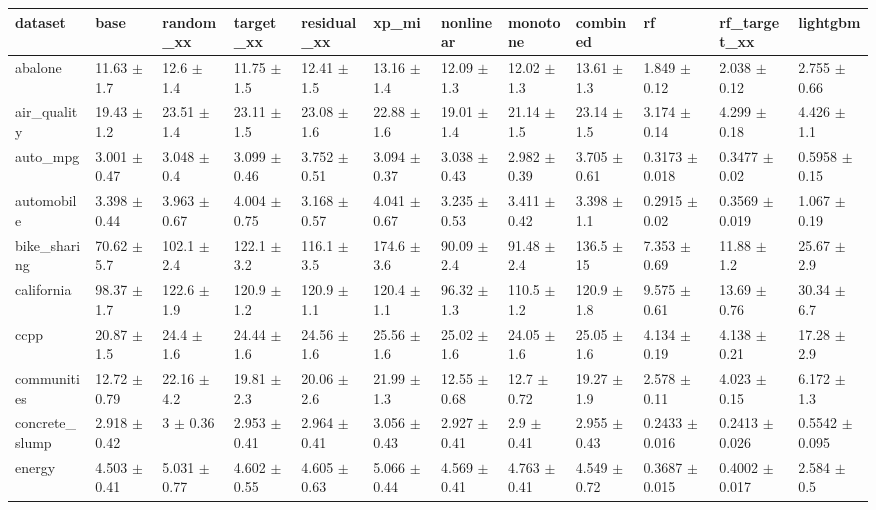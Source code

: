 \begin{tabular}{llllllllllll}
\toprule
dataset & base & random\_xx & target\_xx & residual\_xx & xp\_mi & nonlinear & monotone & combined & rf & rf\_target\_xx & lightgbm \\
\midrule
abalone & 11.63 $\pm$ 1.7 & 12.6 $\pm$ 1.4 & 11.75 $\pm$ 1.5 & 12.41 $\pm$ 1.5 & 13.16 $\pm$ 1.4 & 12.09 $\pm$ 1.3 & 12.02 $\pm$ 1.3 & 13.61 $\pm$ 1.3 & 1.849 $\pm$ 0.12 & 2.038 $\pm$ 0.12 & 2.755 $\pm$ 0.66 \\
air\_quality & 19.43 $\pm$ 1.2 & 23.51 $\pm$ 1.4 & 23.11 $\pm$ 1.5 & 23.08 $\pm$ 1.6 & 22.88 $\pm$ 1.6 & 19.01 $\pm$ 1.4 & 21.14 $\pm$ 1.5 & 23.14 $\pm$ 1.5 & 3.174 $\pm$ 0.14 & 4.299 $\pm$ 0.18 & 4.426 $\pm$ 1.1 \\
auto\_mpg & 3.001 $\pm$ 0.47 & 3.048 $\pm$ 0.4 & 3.099 $\pm$ 0.46 & 3.752 $\pm$ 0.51 & 3.094 $\pm$ 0.37 & 3.038 $\pm$ 0.43 & 2.982 $\pm$ 0.39 & 3.705 $\pm$ 0.61 & 0.3173 $\pm$ 0.018 & 0.3477 $\pm$ 0.02 & 0.5958 $\pm$ 0.15 \\
automobile & 3.398 $\pm$ 0.44 & 3.963 $\pm$ 0.67 & 4.004 $\pm$ 0.75 & 3.168 $\pm$ 0.57 & 4.041 $\pm$ 0.67 & 3.235 $\pm$ 0.53 & 3.411 $\pm$ 0.42 & 3.398 $\pm$ 1.1 & 0.2915 $\pm$ 0.02 & 0.3569 $\pm$ 0.019 & 1.067 $\pm$ 0.19 \\
bike\_sharing & 70.62 $\pm$ 5.7 & 102.1 $\pm$ 2.4 & 122.1 $\pm$ 3.2 & 116.1 $\pm$ 3.5 & 174.6 $\pm$ 3.6 & 90.09 $\pm$ 2.4 & 91.48 $\pm$ 2.4 & 136.5 $\pm$ 15 & 7.353 $\pm$ 0.69 & 11.88 $\pm$ 1.2 & 25.67 $\pm$ 2.9 \\
california & 98.37 $\pm$ 1.7 & 122.6 $\pm$ 1.9 & 120.9 $\pm$ 1.2 & 120.9 $\pm$ 1.1 & 120.4 $\pm$ 1.1 & 96.32 $\pm$ 1.3 & 110.5 $\pm$ 1.2 & 120.9 $\pm$ 1.8 & 9.575 $\pm$ 0.61 & 13.69 $\pm$ 0.76 & 30.34 $\pm$ 6.7 \\
ccpp & 20.87 $\pm$ 1.5 & 24.4 $\pm$ 1.6 & 24.44 $\pm$ 1.6 & 24.56 $\pm$ 1.6 & 25.56 $\pm$ 1.6 & 25.02 $\pm$ 1.6 & 24.05 $\pm$ 1.6 & 25.05 $\pm$ 1.6 & 4.134 $\pm$ 0.19 & 4.138 $\pm$ 0.21 & 17.28 $\pm$ 2.9 \\
communities & 12.72 $\pm$ 0.79 & 22.16 $\pm$ 4.2 & 19.81 $\pm$ 2.3 & 20.06 $\pm$ 2.6 & 21.99 $\pm$ 1.3 & 12.55 $\pm$ 0.68 & 12.7 $\pm$ 0.72 & 19.27 $\pm$ 1.9 & 2.578 $\pm$ 0.11 & 4.023 $\pm$ 0.15 & 6.172 $\pm$ 1.3 \\
concrete\_slump & 2.918 $\pm$ 0.42 & 3 $\pm$ 0.36 & 2.953 $\pm$ 0.41 & 2.964 $\pm$ 0.41 & 3.056 $\pm$ 0.43 & 2.927 $\pm$ 0.41 & 2.9 $\pm$ 0.41 & 2.955 $\pm$ 0.43 & 0.2433 $\pm$ 0.016 & 0.2413 $\pm$ 0.026 & 0.5542 $\pm$ 0.095 \\
energy & 4.503 $\pm$ 0.41 & 5.031 $\pm$ 0.77 & 4.602 $\pm$ 0.55 & 4.605 $\pm$ 0.63 & 5.066 $\pm$ 0.44 & 4.569 $\pm$ 0.41 & 4.763 $\pm$ 0.41 & 4.549 $\pm$ 0.72 & 0.3687 $\pm$ 0.015 & 0.4002 $\pm$ 0.017 & 2.584 $\pm$ 0.5 \\

\end{tabular}
